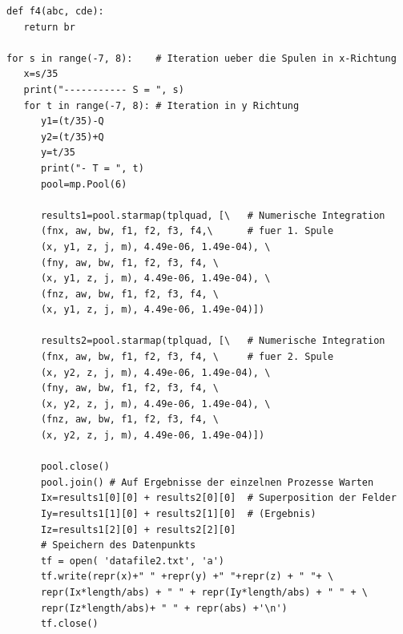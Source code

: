 \documentclass[12pt,a4paper]{article}
\begin{document}
\begin{singlespace}
\begin{lstlisting}
def f4(abc, cde):
   return br

for s in range(-7, 8):    # Iteration ueber die Spulen in x-Richtung
   x=s/35
   print("----------- S = ", s)
   for t in range(-7, 8): # Iteration in y Richtung
      y1=(t/35)-Q
      y2=(t/35)+Q
      y=t/35
      print("- T = ", t)
      pool=mp.Pool(6)
      
      results1=pool.starmap(tplquad, [\   # Numerische Integration
      (fnx, aw, bw, f1, f2, f3, f4,\      # fuer 1. Spule
      (x, y1, z, j, m), 4.49e-06, 1.49e-04), \
      (fny, aw, bw, f1, f2, f3, f4, \
      (x, y1, z, j, m), 4.49e-06, 1.49e-04), \
      (fnz, aw, bw, f1, f2, f3, f4, \
      (x, y1, z, j, m), 4.49e-06, 1.49e-04)])
      
      results2=pool.starmap(tplquad, [\   # Numerische Integration 
      (fnx, aw, bw, f1, f2, f3, f4, \     # fuer 2. Spule
      (x, y2, z, j, m), 4.49e-06, 1.49e-04), \
      (fny, aw, bw, f1, f2, f3, f4, \
      (x, y2, z, j, m), 4.49e-06, 1.49e-04), \
      (fnz, aw, bw, f1, f2, f3, f4, \
      (x, y2, z, j, m), 4.49e-06, 1.49e-04)])
      
      pool.close()
      pool.join() # Auf Ergebnisse der einzelnen Prozesse Warten
      Ix=results1[0][0] + results2[0][0]  # Superposition der Felder 
      Iy=results1[1][0] + results2[1][0]  # (Ergebnis)
      Iz=results1[2][0] + results2[2][0] 
      # Speichern des Datenpunkts
      tf = open( 'datafile2.txt', 'a')
      tf.write(repr(x)+" " +repr(y) +" "+repr(z) + " "+ \
      repr(Ix*length/abs) + " " + repr(Iy*length/abs) + " " + \
      repr(Iz*length/abs)+ " " + repr(abs) +'\n') 
      tf.close() 
\end{lstlisting}
\end{singlespace}
\newpage
\end{document}
